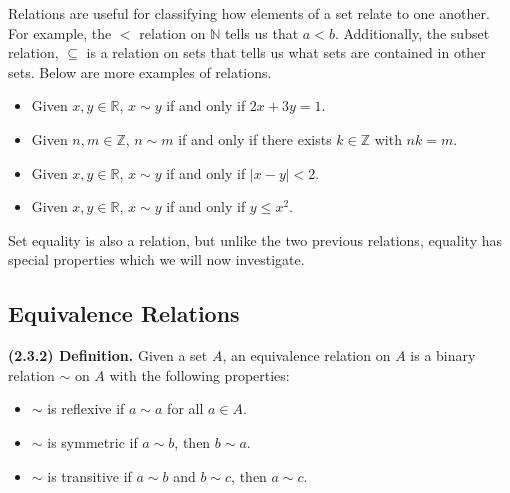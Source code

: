 \documentclass[12pt]{book}
\def\N{{\mathbb{N}}}
\def\R{{\mathbb{R}}}
\def\Z{{\mathbb{Z}}}
\begin{document}

Relations are useful for classifying how elements of a set relate to one another. For example, the $<$ relation on $\N$ tells us that $a<b$. Additionally, the subset relation, $\subseteq$ is a relation on sets that tells us what sets are contained in other sets. Below are more examples of relations.
\begin{itemize}
\item Given $x,y\in\R$, $x\sim y$ if and only if $2x+3y=1$.
\item Given $n,m\in\Z$, $n\sim m$ if and only if there exists $k\in\Z$ with $nk=m$.
\item Given $x,y\in\R$, $x\sim y$ if and only if $|x-y|<2$.
\item Given $x,y\in\R$, $x\sim y$ if and only if $y\leq x^2$.
\end{itemize}

Set equality is also a relation, but unlike the two previous relations, equality has special properties which we will now investigate. 


\subsection*{Equivalence Relations}


\noindent\textbf{(2.3.2) Definition.} Given a set $A$, an equivalence relation on $A$ is a binary relation $\sim$ on $A$ with the following properties:
\begin{itemize}
\item $\sim$ is reflexive if $a\sim a$ for all $a\in A$.
\item $\sim$ is symmetric if $a\sim b$, then $b\sim a$.
\item $\sim$ is transitive if $a\sim b$ and $b\sim c$, then $a\sim c$.
\end{itemize}
\end{document}
